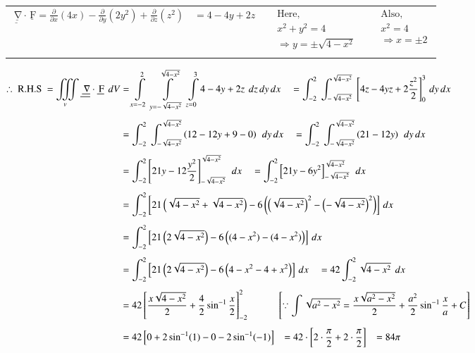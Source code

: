 \documentclass[11pt]{extarticle}
\renewcommand{\vec}[1]{\underline{\,\mathrm{#1}}}
\newcommand{\dx}{{\,dx}}
\newcommand{\dy}{{\,dy}}
\newcommand{\dz}{{\,dz}}
\let\oldnabla\nabla
\renewcommand{\nabla}{\vec{\oldnabla}}
\newcommand{\F}{\vec{F}}
\newcommand{\mint}{\int\displaylimits}
\newcommand{\miiint}{\iiint\displaylimits}
\begin{document}
\vspace{-\baselineskip}
\begin{tabularx}{\textwidth}{X|p{3.25cm}p{4cm}}
   \begin{adjustbox}{valign=t}
      $\nabla \cdot \vec{F}=\frac{\partial}{\partial x}(4x)-\frac{\partial}{\partial y}\left(2 y^2\right)+\frac{\partial}{\partial z} \left(z^2\right) \quad = 4-4y+2z$
   \end{adjustbox}
   &
   \begin{adjustbox}{valign=t}
      $\begin{aligned}
         & \text {Here, } \\
         & x^2+y^2=4 \\
         & \Rightarrow y= \pm \sqrt{4-x^2} \\
      \end{aligned}$
   \end{adjustbox}
   &
   \begin{adjustbox}{valign=t}
      $\begin{aligned}
         & \text {Also, } \\
         & x^2=4 \\
         & \Rightarrow x= \pm 2
      \end{aligned}$
   \end{adjustbox}
\end{tabularx}

\vspace{2ex}
$\begin{aligned}
   \therefore \text { R.H.S }
   = \miiint_v \nabla \cdot \F \ \,dV
   &=\mint_{x=-2}^2 \ \mint_{y=-\sqrt{4-x^2}}^{\sqrt{4-x^2}} \ \mint_{z=0}^3 4-4y+2z \ \dz\dy\dx 
   \quad =\int_{-2}^2 \ \int_{-\sqrt{4-x^2}}^{\sqrt{4-x^2}} \ \left[4 z-4 y z+2 \frac{z^2}{2}\right]_0^3 \dy\dx \\[1ex]
   & =\int_{-2}^2 \ \int_{-\sqrt{4-x^2}}^{\sqrt{4-x^2}}
   \left(12-12 y+9-0\right) \ \dy\dx
   \quad =\int_{-2}^2  \ \int_{-\sqrt{4-x^2}}^{\sqrt{4-x^2}}
   \left(21-12y\right) \ \dy\dx \\[1ex]
   & =\int_{-2}^2\left[21 y-12 \frac{y^2}{2}\right]_{-\sqrt{4-x^2}}^{\sqrt{4-x^2}} \ \dx 
   \quad =\int_{-2}^2\left[21y - 6y^2\right]_{-\sqrt{4-x^2}}^{\sqrt{4-x^2}} \ \dx\\[1ex]
   & =\int_{-2}^2\left[21\left(\sqrt{4-x^2}+\sqrt{4-x^2}\right)-6\left(\left(\sqrt{4-x^2}\right)^2 - \left(-\sqrt{4-x^2}\right)^2\right)\right] \dx \\[1ex]
   & =\int_{-2}^2\left[21\left(2\sqrt{4-x^2}\right)-6\left((4-x^2) - (4-x^2)\right)\right] \dx \\[1ex]
   & =\int_{-2}^2\left[21\left(2\sqrt{4-x^2}\right)-6\left(4-x^2 - 4+x^2\right)\right] \dx 
   \quad =42 \int_{-2}^2 \sqrt{4-x^2} \ \dx\\[1ex]
   & =42\left[\frac{x \sqrt{4-x^2}}{2}+\frac{4}{2} \sin ^{-1} \frac{x}{2}\right]_{-2}^{2} \tabs\tabs
   \left[\because \int \sqrt{a^2-x^2} = \frac{x \sqrt{a^2-x^2}}{2}+\frac{a^2}{2} \sin^{-1} \frac{x}{a}+C\right]\\[1ex]
   & =42\left[0+2 \sin ^{-1}(1)-0-2 \sin ^{-1}(-1)\right] \tab =42 \cdot\left[2 \cdot \frac{\pi}{2}+2 \cdot \frac{\pi}{2}\right] \tab = 84 \pi \\
\end{aligned}$
\end{document}
